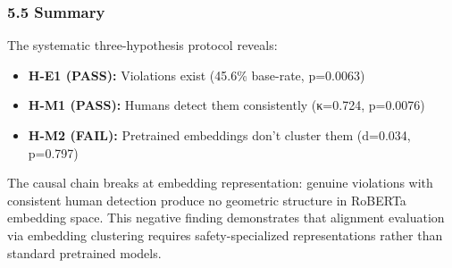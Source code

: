 \subsubsection{5.5 Summary}

The systematic three-hypothesis protocol reveals:
\begin{itemize}
\item \textbf{H-E1 (PASS):} Violations exist (45.6\% base-rate, p=0.0063)
\item \textbf{H-M1 (PASS):} Humans detect them consistently (κ=0.724, p=0.0076)
\item \textbf{H-M2 (FAIL):} Pretrained embeddings don't cluster them (d=0.034, p=0.797)
\end{itemize}

The causal chain breaks at embedding representation: genuine violations with consistent human detection produce no geometric structure in RoBERTa embedding space. This negative finding demonstrates that alignment evaluation via embedding clustering requires safety-specialized representations rather than standard pretrained models.
